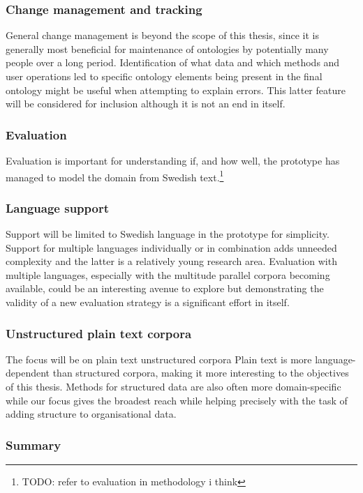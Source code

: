 \documentclass[a4paper]{report}
\newcommand{\todo}[1]{\footnote{{\color{red} TODO: #1}}}
\begin{document}
\subsubsection{Change management and tracking}

General change management is beyond the scope of this thesis, since it is generally most beneficial for maintenance of ontologies by potentially many people over a long period.
Identification of what data and which methods and user operations led to specific ontology elements being present in the final ontology might be useful when attempting to explain errors.
This latter feature will be considered for inclusion although it is not an end in itself.

\subsubsection{Evaluation}

Evaluation is important for understanding if, and how well, the prototype has managed to model the domain from Swedish text.\todo{refer to evaluation in methodology i think}

\subsubsection{Language support}

Support will be limited to Swedish language in the prototype for simplicity.
Support for multiple languages individually or in combination adds unneeded complexity and the latter is a relatively young research area.
Evaluation with multiple languages, especially with the multitude parallel corpora becoming available, could be an interesting avenue to explore but demonstrating the validity of a new evaluation strategy is a significant effort in itself.

\subsubsection{Unstructured plain text corpora}

The focus will be on plain text unstructured corpora
Plain text is more language-dependent than structured corpora, making it more interesting to the objectives of this thesis.
Methods for structured data are also often more domain-specific while our focus gives the broadest reach while helping precisely with the task of adding structure to organisational data.

\subsubsection{Summary}
\end{document}
